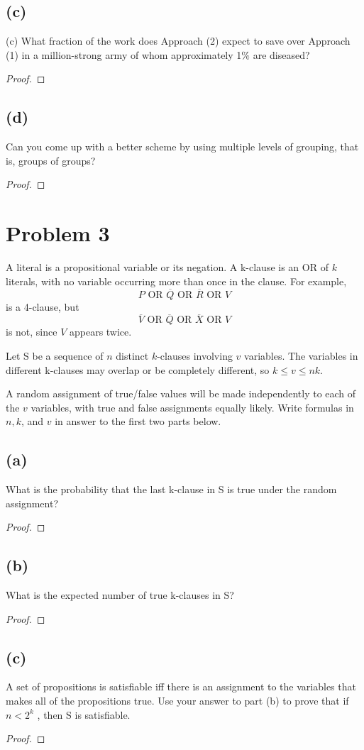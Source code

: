 \documentclass[14pt]{extarticle}
\begin{document}
\subsection{(c)}
(c) What fraction of the work does Approach (2) expect to save over Approach (1) in a million-strong army of whom approximately 1$\%$ are diseased?
\begin{proof}
\end{proof}

\subsection{(d)}
Can you come up with a better scheme by using multiple levels of grouping, that is, groups of groups?
\begin{proof}
\end{proof}

\section{Problem 3}
A literal is a propositional variable or its negation. A k-clause is an OR of $k$ literals, with no variable occurring more than once in the clause. For example,
$$
P \text{ OR } \overline{Q} \text{ OR } \overline{R} \text{ OR } V
$$
is a 4-clause, but
$$
\overline{V} \text{ OR } \overline{Q} \text{ OR } \overline{X} \text{ OR } V
$$
is not, since $V$ appears twice.

Let S be a sequence of $n$ distinct $k$-clauses involving $v$ variables. The variables in different k-clauses may overlap or be completely different, so $k \leq v \leq nk$.

A random assignment of true/false values will be made independently to each of the $v$ variables, with true and false assignments equally likely. Write formulas in $n, k$, and $v$ in answer to the first two parts below.
\subsection{(a)}
What is the probability that the last k-clause in S is true under the random assignment?
\begin{proof}
\end{proof}

\subsection{(b)}
What is the expected number of true k-clauses in S?
\begin{proof}
\end{proof}

\subsection{(c)}
A set of propositions is satisfiable iff there is an assignment to the variables that makes all of the propositions true. Use your answer to part (b) to prove that if $n < 2^k$ , then S is satisfiable.
\begin{proof}
\end{proof}
\end{document}
